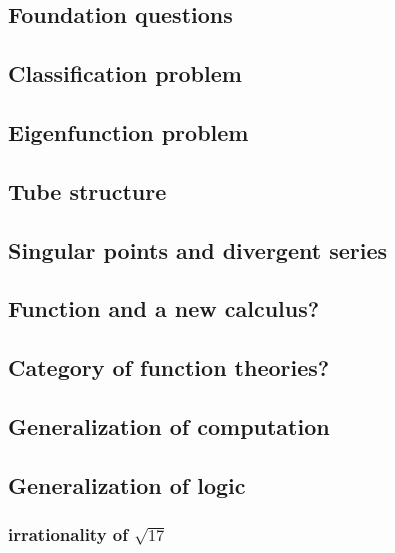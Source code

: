 
\subsection{Foundation questions}\label{sec:foundation}

\subsection{Classification problem}\label{sec:donaghey}

\subsection{Eigenfunction problem}\label{sec:eigenfunction}

\subsection{Tube structure}\label{sec:tube}

\subsection{Singular points and divergent series}\label{sec:singularity}

\subsection{Function and a new calculus?}\label{sec:caculus}

\subsection{Category of function theories?}\label{sec:function}

\subsection{Generalization of computation}\label{sec:computation}

\subsection{Generalization of logic}\label{sec:logic}

\subsubsection{irrationality of $\sqrt{17}$}
